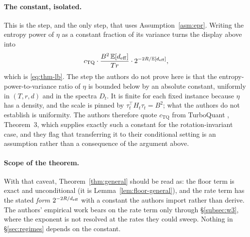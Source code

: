 \paragraph{The constant, isolated.} This is the step, and the only step, that
uses Assumption~\ref{asm:epr}. Writing the entropy power of $\eta$ as a
constant fraction of its variance turns the display above into
\begin{equation*}
  c_{\mathrm{TQ}}\cdot \frac{B^2\,\mathbb{E}[d_{\mathrm{eff}}]}{Tr}\cdot 2^{-2R/\mathbb{E}[d_{\mathrm{eff}}]},
\end{equation*}
which is \eqref{eq:thm-lb}. The step the authors do not prove here is that the
entropy-power-to-variance ratio of $\eta$ is bounded below by an absolute
constant, uniformly in $(T, r, d)$ and in the spectra $D_t$. It is finite for
each fixed instance because $\eta$ has a density, and the scale is pinned by
$\tau_t^\top H_t\tau_t = B^2$; what the authors do not establish is uniformity. The authors
therefore quote $c_{\mathrm{TQ}}$ from TurboQuant
\citep{zandieh2025turboquant}, Theorem~3, which supplies exactly such a
constant for the rotation-invariant case, and they flag that transferring it to
their conditional setting is an assumption rather than a consequence of the
argument above.

\paragraph{Scope of the theorem.} With that caveat, Theorem~\ref{thm:general} should
be read as: the floor term is exact and unconditional (it is
Lemma~\ref{lem:floor-general}), and the rate term has the stated
\emph{form} $2^{-2R/d_{\mathrm{eff}}}$ with a constant the authors import rather than derive. The authors'
empirical work bears on the rate term only through
\S\ref{subsec:w3}, where the exponent is not resolved at the rates they could
sweep. Nothing in \S\ref{sec:regimes} depends on the constant.
